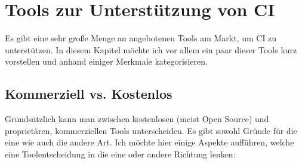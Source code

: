 \pagebreak

\chapter{Tools zur Unterstützung von CI}
Es gibt eine sehr große Menge an angebotenen Tools am Markt, um CI zu unterstützen. In diesem Kapitel möchte ich vor allem ein paar dieser Tools kurz vorstellen und anhand einiger Merkmale kategorisieren.
\section{Kommerziell vs. Kostenlos}
Grundsätzlich kann man zwischen kostenlosen (meist Open Source) und proprietären, kommerziellen Tools unterscheiden. Es gibt sowohl Gründe für die eine wie auch die andere Art. Ich möchte hier einige Aspekte aufführen, welche eine Toolentscheidung in die eine oder andere Richtung lenken:
